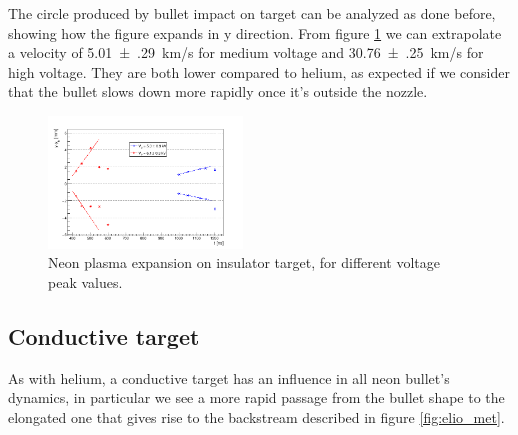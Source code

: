 The circle produced by bullet impact on target can be analyzed as done before, showing how the figure expands in y direction. From figure \ref{fig:neon_c_ylim} we can extrapolate a velocity of \SI{5.01(29)}{\kilo\meter/\second} for medium voltage and \SI{30.76(25)}{\kilo\meter/\second} for high voltage. They are both lower compared to helium, as expected if we consider that the bullet slows down more rapidly once it's outside the nozzle.
\begin{figure}
 \centering
 \includegraphics[width=0.46\textwidth]{Images/Shape/neon_c_ylim.png}
 \caption{Neon plasma expansion on insulator target, for different voltage peak values.}
 \label{fig:neon_c_ylim}
\end{figure}


\subsection{Conductive target}
As with helium, a conductive target has an influence in all neon bullet's dynamics, in particular we see a more rapid passage from the bullet shape to the elongated one that gives rise to the backstream described in figure \ref{fig:elio_met}.

